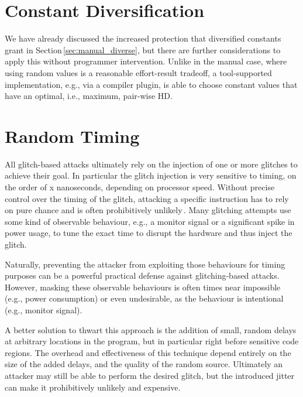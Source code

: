 \section{Constant Diversification}
\label{sec:constant_diverse}
We have already discussed the increased protection that diversified constants grant in Section\,\ref{sec:manual_diverse}, but there are further considerations to apply this without programmer intervention. Unlike in the manual case, where using random values is a reasonable effort-result tradeoff, a tool-supported implementation, e.g., via a compiler plugin, is able to choose constant values that have an optimal, i.e., maximum, pair-wise HD. 


\section{Random Timing}
All glitch-based attacks ultimately rely on the injection of one or more glitches to achieve their goal.  In particular the glitch injection is very sensitive to timing, on the order of x nanoseconds, depending on processor speed. Without precise control over the timing of the glitch, attacking a specific instruction has to rely on pure chance and is often prohibitively unlikely\,\cite{6425517}. Many glitching attempts use some kind of observable behaviour, e.g., a monitor signal or a significant spike in power usage, to tune the exact time to disrupt the hardware and thus inject the glitch.

Naturally, preventing the attacker from exploiting those behaviours for timing purposes can be a powerful practical defense against glitching-based attacks. However, masking these observable behaviours is often times near impossible (e.g., power consumption) or even undesirable, as the behaviour is intentional (e.g., monitor signal).

A better solution to thwart this approach is the addition of small, random delays at arbitrary locations in the program, but in particular right before sensitive code regions. The overhead and effectiveness of this technique depend entirely on the size of the added delays, and the quality of the random source. Ultimately an attacker may still be able to perform the desired glitch, but the introduced jitter can make it prohibitively unlikely and expensive. 


